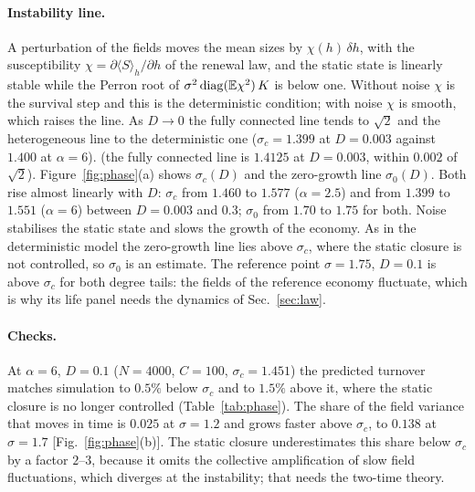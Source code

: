 \documentclass[pre,twocolumn,superscriptaddress,nofootinbib]{revtex4-2}
\newcommand{\E}{\mathbb E}
\begin{document}
\paragraph{Instability line.}  A perturbation of the fields moves the mean sizes by
$\chi(h)\,\delta h$, with the susceptibility $\chi=\partial\langle S\rangle_h/\partial h$ of the renewal law, and
the static state is linearly stable while the Perron root of $\sigma^2\,{\rm diag}(\E\chi^2)\,K$ is below
one.  Without noise $\chi$ is the survival step and this is the deterministic condition; with noise
$\chi$ is smooth, which raises the line.  As $D\to0$ the fully connected line tends to $\sqrt2$ and the
heterogeneous line to the deterministic one ($\sigma_c=1.399$ at $D=0.003$ against $1.400$ at
$\alpha=6$).  (the fully connected line is $1.4125$ at $D=0.003$, within $0.002$ of $\sqrt2$).
Figure~\ref{fig:phase}(a) shows $\sigma_c(D)$ and the zero-growth line $\sigma_0(D)$.  Both rise
almost linearly with $D$: $\sigma_c$ from $1.460$ to $1.577$ ($\alpha=2.5$) and from $1.399$ to $1.551$
($\alpha=6$) between $D=0.003$ and $0.3$; $\sigma_0$ from $1.70$ to $1.75$ for both.  Noise stabilises the
static state and slows the growth of the economy.  As in the deterministic model the zero-growth
line lies above $\sigma_c$, where the static closure is not controlled, so $\sigma_0$ is an estimate.  The reference point $\sigma=1.75$, $D=0.1$ is above $\sigma_c$ for both
degree tails: the fields of the reference economy fluctuate, which is why its life panel needs the
dynamics of Sec.~\ref{sec:law}.

\paragraph{Checks.}  At $\alpha=6$, $D=0.1$ ($N=4000$, $C=100$, $\sigma_c=1.451$) the predicted turnover
matches simulation to $0.5\%$ below $\sigma_c$ and to $1.5\%$ above it, where the static closure is
no longer controlled (Table~\ref{tab:phase}).  The share of the field variance that moves in time
is $0.025$ at $\sigma=1.2$ and grows faster above $\sigma_c$, to $0.138$ at $\sigma=1.7$
[Fig.~\ref{fig:phase}(b)].  The static closure underestimates this share below $\sigma_c$ by a factor
$2$--$3$, because it omits the collective amplification of slow field fluctuations, which diverges
at the instability; that needs the two-time theory.
\end{document}

